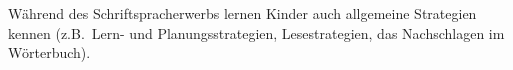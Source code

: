 Während des Schriftspracherwerbs lernen Kinder auch allgemeine Strategien kennen (z.B.\ Lern- und Planungsstrategien, Lesestrategien, das Nachschlagen im Wörterbuch).